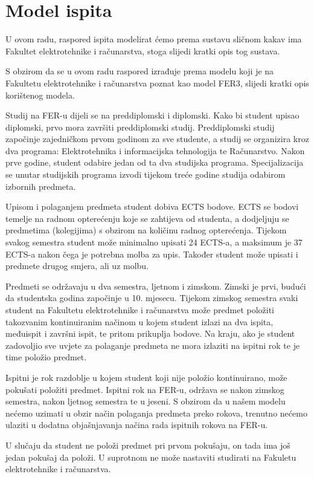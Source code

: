 \documentclass[times, utf8, zavrsni, numeric]{fer}
\begin{document}
\section{Model ispita}
U ovom radu, raspored ispita modelirat ćemo prema sustavu sličnom kakav ima Fakultet elektrotehnike i računarstva, stoga slijedi kratki opis tog sustava.\par
S obzirom da se u ovom radu raspored izrađuje prema modelu koji je na Fakultetu elektrotehnike i računarstva poznat kao model FER3, slijedi kratki opis korištenog modela.\par
Studij na FER-u dijeli se na preddiplomski i diplomski. Kako bi student upisao diplomski, prvo mora završiti preddiplomski studij. Preddiplomski studij započinje zajedničkom prvom godinom za sve studente, a studij se organizira kroz dva programa: Elektrotehnika i informacijska tehnologija te Računarstvo. Nakon prve godine, student odabire jedan od ta dva studijska programa. Specijalizacija se unutar studijskih programa izvodi tijekom treće godine studija odabirom izbornih predmeta.\par
Upisom i polaganjem predmeta student dobiva ECTS bodove. ECTS se bodovi temelje na radnom opterećenju koje se zahtijeva od studenta, a dodjeljuju se predmetima (kolegijima) s obzirom na količinu radnog opterećenja. Tijekom svakog semestra student može minimalno upisati 24 ECTS-a, a maksimum je 37 ECTS-a nakon čega je potrebna molba za upis. Također student može upisati i predmete drugog smjera, ali uz molbu.\par
Predmeti se održavaju u dva semestra, ljetnom i zimskom. Zimski je prvi, budući da studentska godina započinje u 10. mjesecu. Tijekom zimskog semestra svaki student na Fakultetu elektrotehnike i računarstva može predmet položiti takozvanim kontinuiranim načinom u kojem student izlazi na dva ispita, međuispit i završni ispit, te pritom prikuplja bodove. Na kraju, ako je student zadovoljio sve uvjete za polaganje predmeta ne mora izlaziti na ispitni rok te je time položio predmet.\par
Ispitni je rok razdoblje u kojem student koji nije položio kontinuirano, može pokušati položiti predmet. Ispitni rok na FER-u, održava se nakon zimskog semestra, nakon ljetnog semestra te u jeseni. S obzirom da u našem modelu nećemo uzimati u obzir način polaganja predmeta preko rokova, trenutno nećemo ulaziti u dodatna objašnjavanja načina rada ispitnih rokova na FER-u.\par
U slučaju da student ne položi predmet pri prvom pokušaju, on tada ima još jedan pokušaj da položi. U suprotnom ne može nastaviti studirati na Fakuletu elektrotehnike i računarstva.\par
\end{document}
